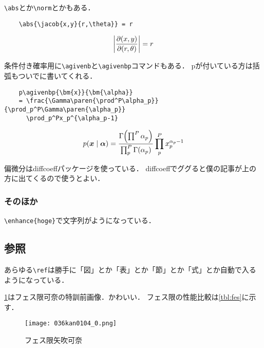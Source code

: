\verb|\abs|とか\verb|\norm|とかもある．
\begin{verbatim}
    \abs{\jacob{x,y}{r,\theta}} = r
\end{verbatim}
\begin{equation}
    \abs{\jacob{x,y}{r,\theta}} = r
    \label{eq:eq3}
\end{equation}

条件付き確率用に\verb|\agivenb|と\verb|\agivenbp|コマンドもある．
pが付いている方は括弧もついでに書いてくれる．
\begin{verbatim}
    p\agivenbp{\bm{x}}{\bm{\alpha}}
    = \frac{\Gamma\paren{\prod^P\alpha_p}}{\prod_p^P\Gamma\paren{\alpha_p}}
      \prod_p^Px_p^{\alpha_p-1}
\end{verbatim}
\begin{equation}
    p\agivenbp{\bm{x}}{\bm{\alpha}} = \frac{\Gamma\paren{\prod^P\alpha_p}}{\prod_p^P\Gamma\paren{\alpha_p}}\prod_p^Px_p^{\alpha_p-1}
    \label{eq:eq4}
\end{equation}

偏微分はdiffcoeffパッケージを使っている．
diffcoeffでググると僕の記事が上の方に出てくるので使うとよい．

\subsubsection{そのほか}

\verb|\enhance{hoge}|で文字列がようになっている．

\subsection{参照}

あらゆる\verb|\ref|は勝手に「図」とか「表」とか「節」とか「式」とか自動で入るようになっている．

\ref{fig:kana}はフェス限可奈の特訓前画像．かわいい．
フェス限の性能比較は\ref{tbl:fes}に示す．

\begin{figure}
    \centering
    \texttt{[image: 036kan0104\_0.png]}
    \caption{フェス限矢吹可奈}
    \label{fig:kana}
\end{figure}

